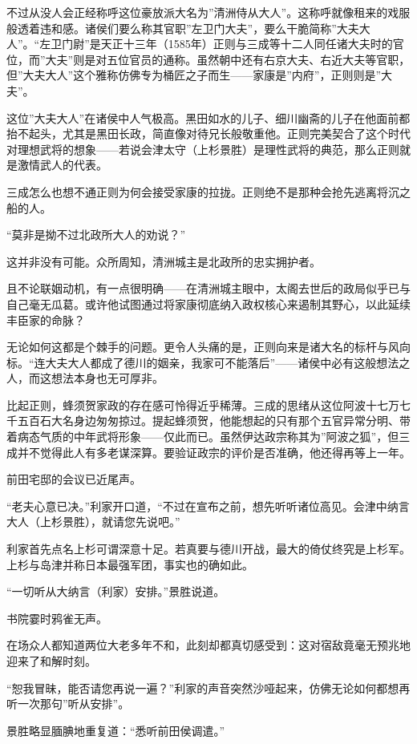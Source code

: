 \documentclass[
]{article}
\begin{document}
不过从没人会正经称呼这位豪放派大名为''清洲侍从大人''。这称呼就像租来的戏服般透着违和感。诸侯们要么称其官职''左卫门大夫''，要么干脆简称''大夫大人''。``左卫门尉''是天正十三年（1585年）正则与三成等十二人同任诸大夫时的官位，而''大夫''则是对五位官员的通称。虽然朝中还有右京大夫、右近大夫等官职，但''大夫大人''这个雅称仿佛专为桶匠之子而生------家康是''内府''，正则则是''大夫''。

这位''大夫大人''在诸侯中人气极高。黑田如水的儿子、细川幽斋的儿子在他面前都抬不起头，尤其是黑田长政，简直像对待兄长般敬重他。正则完美契合了这个时代对理想武将的想象------若说会津太守（上杉景胜）是理性武将的典范，那么正则就是激情武人的代表。

三成怎么也想不通正则为何会接受家康的拉拢。正则绝不是那种会抢先逃离将沉之船的人。

``莫非是拗不过北政所大人的劝说？''

这并非没有可能。众所周知，清洲城主是北政所的忠实拥护者。

且不论联姻动机，有一点很明确------在清洲城主眼中，太阁去世后的政局似乎已与自己毫无瓜葛。或许他试图通过将家康彻底纳入政权核心来遏制其野心，以此延续丰臣家的命脉？

无论如何这都是个棘手的问题。更令人头痛的是，正则向来是诸大名的标杆与风向标。``连大夫大人都成了德川的姻亲，我家可不能落后''------诸侯中必有这般想法之人，而这想法本身也无可厚非。

比起正则，蜂须贺家政的存在感可怜得近乎稀薄。三成的思绪从这位阿波十七万七千五百石大名身边匆匆掠过。提起蜂须贺，他能想起的只有那个五官异常分明、带着病态气质的中年武将形象------仅此而已。虽然伊达政宗称其为''阿波之狐''，但三成并不觉得此人有多老谋深算。要验证政宗的评价是否准确，他还得再等上一年。

前田宅邸的会议已近尾声。

``老夫心意已决。''利家开口道，``不过在宣布之前，想先听听诸位高见。会津中纳言大人（上杉景胜），就请您先说吧。''

利家首先点名上杉可谓深意十足。若真要与德川开战，最大的倚仗终究是上杉军。上杉与岛津并称日本最强军团，事实也的确如此。

``一切听从大纳言（利家）安排。''景胜说道。

书院霎时鸦雀无声。

在场众人都知道两位大老多年不和，此刻却都真切感受到：这对宿敌竟毫无预兆地迎来了和解时刻。

``恕我冒昧，能否请您再说一遍？''利家的声音突然沙哑起来，仿佛无论如何都想再听一次那句''听从安排''。

景胜略显腼腆地重复道：``悉听前田侯调遣。''
\end{document}
